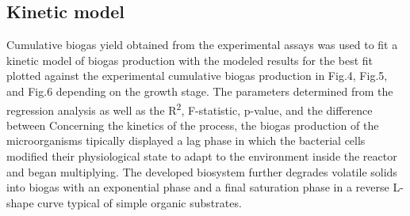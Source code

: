 \subsection{Kinetic model}
Cumulative biogas yield obtained from the experimental assays was used to fit a kinetic model of biogas production with the modeled results for the best fit plotted against the experimental cumulative biogas production in Fig.4, Fig.5, and Fig.6 depending on the growth stage. The parameters determined from the regression analysis as well as the R\textsuperscript{2}, F-statistic, p-value, and the difference between
Concerning the kinetics of the process, the biogas production of the microorganisms tipically displayed a lag phase in which the bacterial cells modified their physiological state to adapt to the environment inside the reactor and began multiplying. The developed biosystem further degrades volatile solids into biogas with an exponential phase and a final saturation phase in a reverse L-shape curve typical of simple organic substrates.  